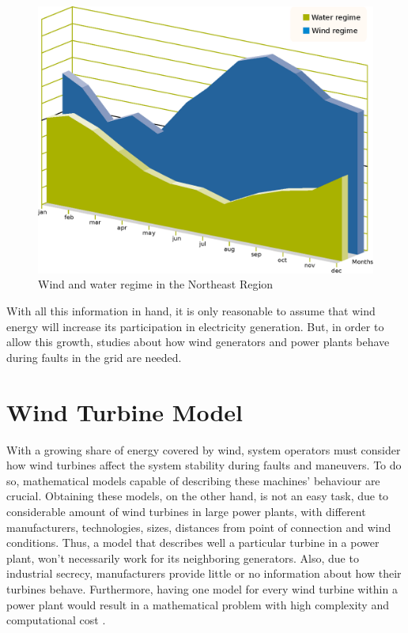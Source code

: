 \begin{figure}
	\caption{Wind and water regime in the Northeast Region}
	\begin{center}
		\includegraphics[scale=0.5]{Images/WindWater.eps}
	\end{center}
	\label{fig: WindWater}
\end{figure}

With all this information in hand, it is only reasonable to assume that wind energy will increase its participation in electricity generation. But, in order to allow this growth, studies about how wind generators and power plants behave during faults in the grid are needed.

\section{Wind Turbine Model}

With a growing share of energy covered by wind, system operators must consider how wind turbines affect the system stability during faults and maneuvers. To do so, mathematical models capable of describing these machines' behaviour are crucial. Obtaining these models, on the other hand, is not an easy task, due to considerable amount of wind turbines in large power plants, with different manufacturers, technologies, sizes, distances from point of connection and wind conditions. Thus, a model that describes well a particular turbine in a power plant, won't necessarily work for its neighboring generators. Also, due to industrial secrecy, manufacturers provide little or no information about how their turbines behave. Furthermore, having one model for every wind turbine within a power plant would result in a mathematical problem with high complexity and computational cost \cite{Erlich2012}.

